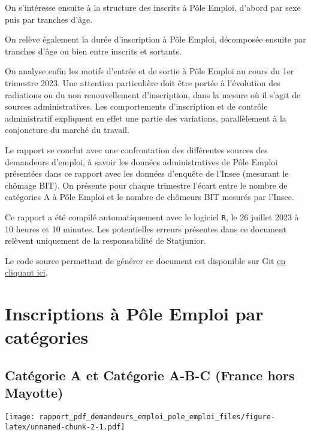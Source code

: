 \documentclass[
  paper=a4,
  ,captions=tableheading
]{scrartcl}
\begin{document}
On s'intéresse ensuite à la structure des inscrits à Pôle Emploi,
d'abord par sexe puis par tranches d'âge.

On relève également la durée d'inscription à Pôle Emploi, décomposée
ensuite par tranches d'âge ou bien entre inscrits et sortants.

On analyse enfin les motifs d'entrée et de sortie à Pôle Emploi au cours
du 1er trimestre 2023. Une attention particulière doit être portée à
l'évolution des radiations ou du non renouvellement d'inscription, dans
la mesure où il s'agit de sources administratives. Les comportements
d'inscription et de contrôle administratif expliquent en effet une
partie des variations, parallèlement à la conjoncture du marché du
travail.

Le rapport se conclut avec une confrontation des différentes sources des
demandeurs d'emploi, à savoir les données administratives de Pôle Emploi
présentées dans ce rapport avec les données d'enquête de l'Insee
(mesurant le chômage BIT). On présente pour chaque trimestre l'écart
entre le nombre de catégories A à Pôle Emploi et le nombre de chômeurs
BIT mesurés par l'Insee.

Ce rapport a été compilé automatiquement avec le logiciel \texttt{R}, le
26 juillet 2023 à 10 heures et 10 minutes. Les potentielles erreurs
présentes dans ce document relèvent uniquement de la responsabilité de
Statjunior.

Le code source permettant de générer ce document est disponible sur Git
\href{https://github.com/statjunior/Statjunior/tree/main/Demandeurs\%20d\textquotesingle{}emploi\%20(P\%C3\%B4le\%20Emploi)/}{en
cliquant ici}.

\hypertarget{inscriptions-uxe0-puxf4le-emploi-par-catuxe9gories}{%
\section{Inscriptions à Pôle Emploi par
catégories}\label{inscriptions-uxe0-puxf4le-emploi-par-catuxe9gories}}

\hypertarget{catuxe9gorie-a-et-catuxe9gorie-a-b-c-france-hors-mayotte}{%
\subsection{Catégorie A et Catégorie A-B-C (France hors
Mayotte)}\label{catuxe9gorie-a-et-catuxe9gorie-a-b-c-france-hors-mayotte}}

\texttt{[image: rapport\_pdf\_demandeurs\_emploi\_pole\_emploi\_files/figure-latex/unnamed-chunk-2-1.pdf]}
\end{document}
